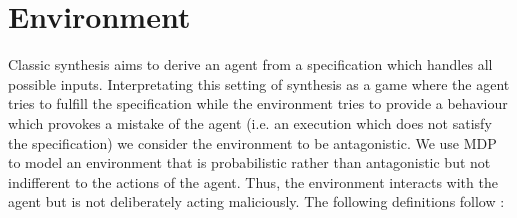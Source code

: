 \chapter{Environment}
Classic synthesis aims to derive an agent from a specification which handles
all possible inputs. Interpretating this setting of synthesis as a game where
the agent tries to fulfill the specification while the environment tries to
provide a behaviour which provokes a mistake of the agent (i.e. an execution
which does not satisfy the specification) we consider the environment to be
antagonistic. We use \ac{MDP} to model an environment that is probabilistic
rather than antagonistic but not indifferent to the actions of the agent. Thus,
the environment interacts with the agent but is not deliberately acting
maliciously. The following definitions follow \cite{RandAutoInfTrees}:

